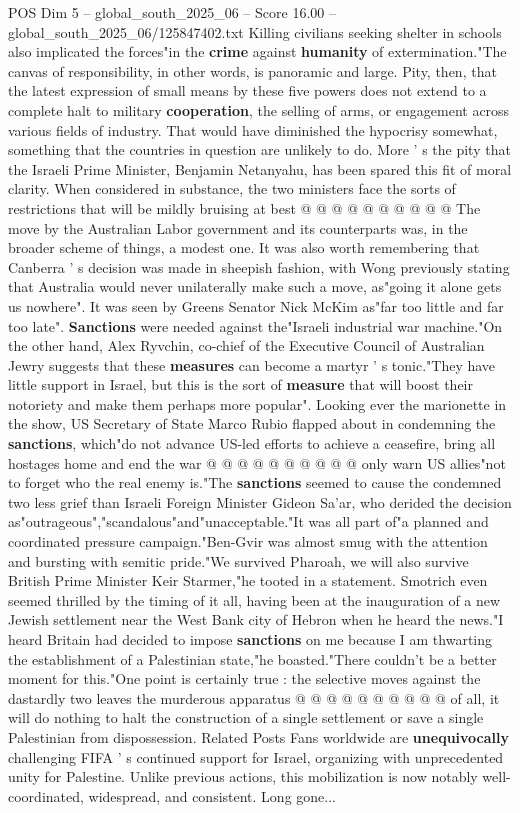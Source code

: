 \begin{textsample}{POS Dim 5 – global\_south\_2025\_06 – Score 16.00 – global\_south\_2025\_06/125847402.txt}
Killing civilians seeking shelter in schools also implicated the forces"in the \textbf{crime} against \textbf{humanity} of extermination."The canvas of responsibility, in other words, is panoramic and large.
Pity, then, that the latest expression of small means by these five powers does not extend to a complete halt to military \textbf{cooperation}, the selling of arms, or engagement across various fields of industry.
That would have diminished the hypocrisy somewhat, something that the countries in question are unlikely to do.
More ' s the pity that the Israeli Prime Minister, Benjamin Netanyahu, has been spared this fit of moral clarity.
When considered in substance, the two ministers face the sorts of restrictions that will be mildly bruising at best @ @ @ @ @ @ @ @ @ @ The move by the Australian Labor government and its counterparts was, in the broader scheme of things, a modest one.
It was also worth remembering that Canberra ' s decision was made in sheepish fashion, with Wong previously stating that Australia would never unilaterally make such a move, as"going it alone gets us nowhere".
It was seen by Greens Senator Nick McKim as"far too little and far too late". \textbf{Sanctions} were needed against the"Israeli industrial war machine."On the other hand, Alex Ryvchin, co-chief of the Executive Council of Australian Jewry suggests that these \textbf{measures} can become a martyr ' s tonic."They have little support in Israel, but this is the sort of \textbf{measure} that will boost their notoriety and make them perhaps more popular".
Looking ever the marionette in the show, US Secretary of State Marco Rubio flapped about in condemning the \textbf{sanctions}, which"do not advance US-led efforts to achieve a ceasefire, bring all hostages home and end the war @ @ @ @ @ @ @ @ @ @ only warn US allies"not to forget who the real enemy is."The \textbf{sanctions} seemed to cause the condemned two less grief than Israeli Foreign Minister Gideon Sa'ar, who derided the decision as"outrageous","scandalous"and"unacceptable."It was all part of"a planned and coordinated pressure campaign."Ben-Gvir was almost smug with the attention and bursting with semitic pride."We survived Pharoah, we will also survive British Prime Minister Keir Starmer,"he tooted in a statement.
Smotrich even seemed thrilled by the timing of it all, having been at the inauguration of a new Jewish settlement near the West Bank city of Hebron when he heard the news."I heard Britain had decided to impose \textbf{sanctions} on me because I am thwarting the establishment of a Palestinian state,"he boasted."There couldn't be a better moment for this."One point is certainly true : the selective moves against the dastardly two leaves the murderous apparatus @ @ @ @ @ @ @ @ @ @ of all, it will do nothing to halt the construction of a single settlement or save a single Palestinian from dispossession.
Related Posts Fans worldwide are \textbf{unequivocally} challenging FIFA ' s continued support for Israel, organizing with unprecedented unity for Palestine.
Unlike previous actions, this mobilization is now notably well-coordinated, widespread, and consistent.
Long gone...


\end{textsample}
